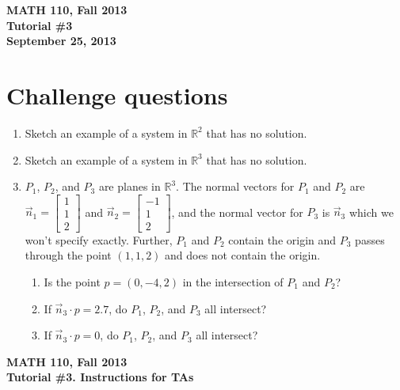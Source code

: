 \documentclass[11pt]{exam}
\newcommand{\R}{\mathbb{R}}
\newcommand{\mat}[1]{\begin{bmatrix}#1\end{bmatrix}}
\newcommand{\mthCourse}{MATH 110}
\newcommand{\mthTerm}{Fall 2013}
\newcommand{\mthTutorialNumber}{3}
\newcommand{\mthDate}{September 25, 2013}
\begin{document}
\newpage
{
	\begin{center}
		{\bf \mthCourse, \mthTerm}\\ 
		{\bf Tutorial \#\mthTutorialNumber}\\
		{\bf \mthDate}
	\end{center}
}

\section*{Challenge questions}

\begin{enumerate}[resume]

	\item Sketch an example of a system in $\R^2$ that has no solution.
	\item Sketch an example of a system in $\R^3$ that has no solution.
	\item $P_1$, $P_2$, and $P_3$ are planes in $\R^3$.  The normal vectors
	for $P_1$ and $P_2$ are $\vec n_1=\mat{1\\1\\2}$ and $\vec n_2=\mat{-1\\1\\2}$,
	and the normal vector for $P_3$ is $\vec n_3$ which we won't specify
	exactly.
	Further, $P_1$ and $P_2$ contain
	the origin and $P_3$ passes through the point $(1,1,2)$ and does not contain the origin.
	\begin{enumerate}
		\item Is the point $p=(0,-4,2)$ in the intersection of $P_1$ and $P_2$?
		\item If $\vec n_3\cdot p = 2.7$, do $P_1$, $P_2$, and $P_3$ all intersect?
		\item If $\vec n_3\cdot p = 0$, do $P_1$, $P_2$, and $P_3$ all intersect?
	\end{enumerate}

\end{enumerate}



\newpage
{\small
	\begin{center}
		{\bf \mthCourse, \mthTerm}\\ 
		{\bf Tutorial \#\mthTutorialNumber. Instructions for TAs}
	\end{center}
}
\end{document}
